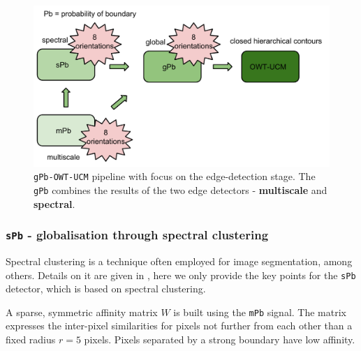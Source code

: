 \begin{figure}[ht!]
\centering
\includegraphics[width=1\textwidth]{images/gPb-OWT-UCM/gPb-algorithm-details-mPb_sPb_gPb.pdf}
\caption[{\tt gPb-OWT-UCM} pipeline with focus on the edge-detection stage - {\tt gPb}]{{\tt gPb-OWT-UCM} pipeline with focus on the edge-detection stage. The {\tt gPb} combines the results of the two edge detectors - {\bf multiscale} and {\bf spectral}.}
\label{fig:gPb-algorithm-details-mPb_sPb_gPb}
\end{figure}

\subsubsection{{\tt sPb} - globalisation through spectral clustering}
\label{sec:ch3-sPb}

Spectral clustering is a technique often employed for image segmentation, among others. Details on it are given in \cite{Leung1998contour,Shi2000normalized,Fowlkes2003learning,Fowlkes04}, here we only provide the key %
points for the %
{\tt sPb} detector, which is based on %
spectral clustering. 

A sparse, symmetric affinity matrix $W$ is built using the {\tt mPb} signal. The matrix expresses the inter-pixel similarities for pixels not further from each other than a fixed radius $r=5$ pixels. Pixels separated by a strong boundary have low affinity.


